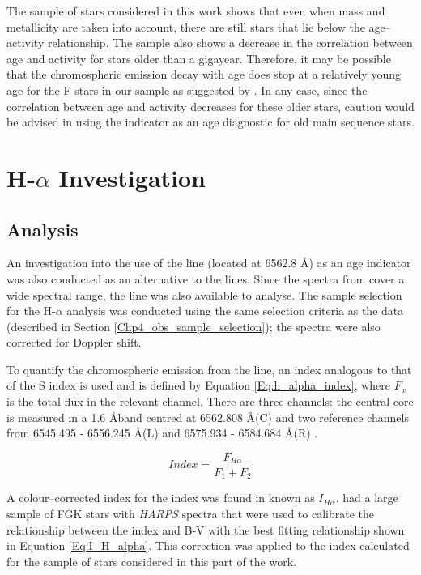 The sample of stars considered in this work shows that even when mass and metallicity are taken into account, there are still stars that lie below the age--activity relationship. The sample also shows a decrease in the correlation between age and activity for stars older than a gigayear. Therefore, it may be possible that the chromospheric emission decay with age does stop at a relatively young age for the F stars in our sample as suggested by \citet{Pace_2013}. In any case, since the correlation between age and activity decreases for these older stars, caution would be advised in using the \Rprime indicator as an age diagnostic for old main sequence stars.

\section{\texorpdfstring{H-$\alpha$}{H-alpha} Investigation}
\label{Chp4_halpha}
\subsection{Analysis}
An investigation into the use of the \Halpha line (located at 6562.8 \AA) as an age indicator was also conducted as an alternative to the \caII lines. Since the spectra from \citet{Bruntt_etal_2012} cover a wide spectral range, the \Halpha line was also available to analyse. The sample selection for the H-$\alpha$ analysis was conducted using the same selection criteria as the \caII data (described in Section \ref{Chp4_obs_sample_selection}); the spectra were also corrected for Doppler shift.

To quantify the chromospheric emission from the \Halpha line, an index analogous to that of the S index is used and is defined by Equation \ref{Eq:h_alpha_index}, where $F_{x}$ is the total flux in the relevant channel. There are three channels: the central \Halpha core is measured in a 1.6 \AA \space band centred at 6562.808 \AA \space (C) and two reference channels from 6545.495 - 6556.245 \AA \space (L) and 6575.934 - 6584.684 \AA \space (R) \citep{Gomes_da_Silva_etal_2011}.

\begin{equation}
    Index = \frac{F_{H{\alpha}}}{F_{1}+F_{2}}
    \label{Eq:h_alpha_index}
\end{equation}

A colour--corrected index for the \Halpha index was found in \citet{Gomes_da_Silva_etal_2014} known as $I_{H\alpha}$. \citet{Gomes_da_Silva_etal_2014} had a large sample of FGK stars with \textit{HARPS} spectra that were used to calibrate the relationship between the \Halpha index and B-V with the best fitting relationship shown in Equation \ref{Eq:I_H_alpha}. This correction was applied to the \Halpha index calculated for the sample of stars considered in this part of the work.

